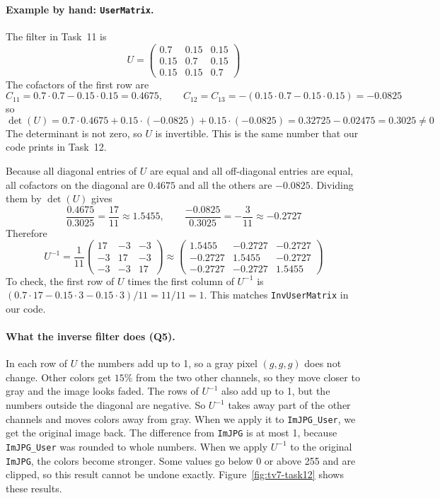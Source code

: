 \paragraph{Example by hand: \texttt{UserMatrix}.}
The filter in Task~11 is
\[
  U = \begin{pmatrix}
    0.7  & 0.15 & 0.15 \\
    0.15 & 0.7  & 0.15 \\
    0.15 & 0.15 & 0.7
  \end{pmatrix}
\]
The cofactors of the first row are
\[
  C_{11} = 0.7 \cdot 0.7 - 0.15 \cdot 0.15 = 0.4675, \qquad
  C_{12} = C_{13} = -(0.15 \cdot 0.7 - 0.15 \cdot 0.15) = -0.0825
\]
so
\[
  \det(U) = 0.7 \cdot 0.4675 + 0.15 \cdot (-0.0825) + 0.15 \cdot (-0.0825)
          = 0.32725 - 0.02475 = 0.3025 \neq 0
\]
The determinant is not zero, so $U$ is invertible. This is the same number that
our code prints in Task~12.

Because all diagonal entries of $U$ are equal and all off-diagonal entries are
equal, all cofactors on the diagonal are $0.4675$ and all the others are
$-0.0825$. Dividing them by $\det(U)$ gives
\[
  \frac{0.4675}{0.3025} = \frac{17}{11} \approx 1.5455, \qquad
  \frac{-0.0825}{0.3025} = -\frac{3}{11} \approx -0.2727
\]
Therefore
\[
  U^{-1} = \frac{1}{11}
  \begin{pmatrix} 17 & -3 & -3 \\ -3 & 17 & -3 \\ -3 & -3 & 17 \end{pmatrix}
  \approx
  \begin{pmatrix}
     1.5455 & -0.2727 & -0.2727 \\
    -0.2727 &  1.5455 & -0.2727 \\
    -0.2727 & -0.2727 &  1.5455
  \end{pmatrix}
\]
To check, the first row of $U$ times the first column of $U^{-1}$ is
$(0.7 \cdot 17 - 0.15 \cdot 3 - 0.15 \cdot 3)/11 = 11/11 = 1$.
This matches \texttt{InvUserMatrix} in our code.

\paragraph{What the inverse filter does (Q5).}
In each row of $U$ the numbers add up to 1, so a gray pixel $(g,g,g)$ does not
change. Other colors get $15\%$ from the two other channels, so they move closer
to gray and the image looks faded. The rows of $U^{-1}$ also add up to 1, but the
numbers outside the diagonal are negative. So $U^{-1}$ takes away part of the
other channels and moves colors away from gray. When we apply it to
\texttt{ImJPG\_User}, we get the original image back. The difference from
\texttt{ImJPG} is at most 1, because \texttt{ImJPG\_User} was rounded to whole
numbers. When we apply $U^{-1}$ to the original \texttt{ImJPG}, the colors become
stronger. Some values go below 0 or above 255 and are clipped, so this result
cannot be undone exactly. Figure~\ref{fig:tv7-task12} shows these results.

